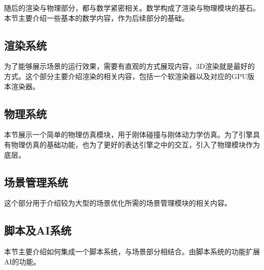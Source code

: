 随后的渲染与物理部分，都与数学紧密相关。数学构成了渲染与物理模块的基石。本节主要介绍一些基本的数学内容，作为后续部分的基础。

\maketitle
\subsection{渲染系统}

为了能够展示场景的运行效果，需要有直观的方式展现内容，3D渲染就是最好的方式。这个部分主要介绍渲染的相关内容，包括一个软渲染器以及对应的GPU版本渲染器。

\maketitle
\subsection{物理系统}

本节展示一个简单的物理仿真模块，用于刚体碰撞与刚体动力学仿真。为了引擎具有物理仿真的基础功能，也为了更好的表达引擎之中的交互，引入了物理模块作为底层。

\maketitle
\subsection{场景管理系统}

这个部分用于介绍较为大型的场景优化所需的场景管理模块的相关内容。

\maketitle
\subsection{脚本及AI系统}

本节主要介绍如何集成一个脚本系统，与场景部分相结合。由脚本系统的功能扩展AI的功能。
